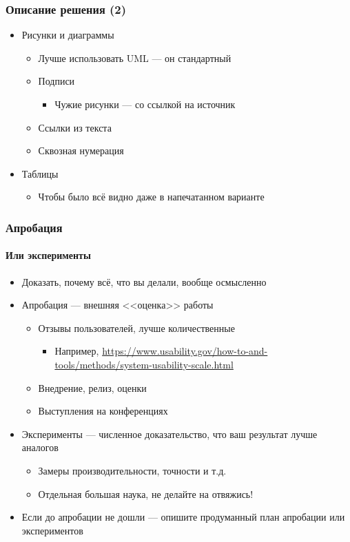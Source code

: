 \documentclass{../../slides-style}
\begin{document}
    \begin{frame}
        \frametitle{Описание решения (2)}
        \begin{itemize}
            \item Рисунки и диаграммы
            \begin{itemize}
                \item Лучше использовать UML --- он стандартный
                \item Подписи
                \begin{itemize}
                    \item Чужие рисунки --- со ссылкой на источник
                \end{itemize}
                \item Ссылки из текста
                \item Сквозная нумерация
            \end{itemize}
            \item Таблицы
            \begin{itemize}
                \item Чтобы было всё видно даже в напечатанном варианте
            \end{itemize}
        \end{itemize}
    \end{frame}

    \begin{frame}
        \frametitle{Апробация}
        \framesubtitle{Или эксперименты}
        \begin{itemize}
            \item Доказать, почему всё, что вы делали, вообще осмысленно
            \item Апробация --- внешняя <<оценка>> работы
            \begin{itemize}
                \item Отзывы пользователей, лучше количественные
                \begin{itemize}
                    \item Например, \url{https://www.usability.gov/how-to-and-tools/methods/system-usability-scale.html}
                \end{itemize}
                \item Внедрение, релиз, оценки
                \item Выступления на конференциях
            \end{itemize}
            \item Эксперименты --- численное доказательство, что ваш результат лучше аналогов
            \begin{itemize}
                \item Замеры производительности, точности и т.д.
                \item Отдельная большая наука, не делайте на отвяжись!
            \end{itemize}
            \item Если до апробации не дошли --- опишите продуманный план апробации или экспериментов
        \end{itemize}
    \end{frame}
\end{document}
